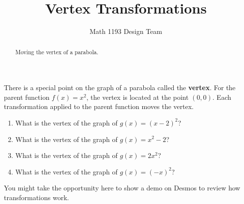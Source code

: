 \documentclass[noauthor]{ximera}
\title{Vertex Transformations}
\author{Math 1193 Design Team}
\begin{document}
\begin{abstract}
    Moving the vertex of a parabola.
\end{abstract}
\maketitle

There is a special point on the graph of a parabola called the 
\textbf{vertex}. For the parent function \(f\left(x\right)=x^2\), 
the vertex is located at the point \((0,0)\). Each transformation 
applied to the parent function moves the vertex.

\begin{enumerate}
    \item What is the vertex of the graph of \(g(x) = (x - 2)^2\)?
    \item What is the vertex of the graph of \(g(x) = x^2 - 2\)?
    \item What is the vertex of the graph of \(g(x) = 2x^2\)?
    \item What is the vertex of the graph of \(g(x) = (-x)^2\)?
\end{enumerate}

\begin{instructorNotes}
You might take the opportunity here to show a demo on Desmos to review
how transformations work.
\end{instructorNotes}
\end{document}
